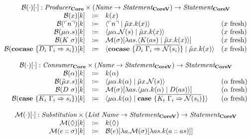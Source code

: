 \begin{gather*}
  \begin{array}{rcll}
    \multicolumn{4}{c}{\bind{\cdot}{\cdot} : \emph{Producer}_{\targetlang{}} \times (\emph{Name} \rightarrow \emph{Statement}_{\targetvar{}}) \rightarrow \emph{Statement}_{\targetvar{}}}\\
    \bind{x}{k} & \coloneq & k(x) & \\
    \bind{\lit{n}}{k} & \coloneq & \cut{\lit{n}}{\tilde{\mu}x.k(x)} & \fresh{x} \\
    \bind{\mu\alpha.s}{k} & \coloneq & \cut{\mu\alpha.\name{s}}{\tilde{\mu}x.k(x)} & \fresh{x} \\
    \bind{K\ \sigma}{k} & \coloneq & \binds{\sigma}{\lambda as.\cut{K(as)}{\tilde{\mu}x.k(x)}} & \fresh{x} \\
    \bind{\cocase{\overline{D_i\ \Gamma_i \Rightarrow s_i}}}{k} & \coloneq & \cut{\cocase{\overline{D_i\ \Gamma_i \Rightarrow \name{s_i}}}}{\tilde{\mu}x.k(x)} & \fresh{x} \\
    \\
    \multicolumn{4}{c}{\bind{\cdot}{\cdot} : \emph{Consumer}_{\targetlang{}} \times (\emph{Name} \rightarrow \emph{Statement}_{\targetvar{}}) \rightarrow \emph{Statement}_{\targetvar{}}}\\
    \bind{\alpha}{k} & \coloneq & k(\alpha) & \\
    \bind{\tilde{\mu}x.s}{k} & \coloneq & \cut{\mu\alpha.k(\alpha)}{\tilde{\mu}x.\name{s}} & \fresh{\alpha} \\
    \bind{D\ \sigma}{k} & \coloneq & \binds{\sigma}{\lambda as.\cut{\mu\alpha.k(\alpha)}{D(as)}} & \fresh{\alpha} \\
    \bind{\case{\overline{K_i\ \Gamma_i \Rightarrow s_i}}}{k} & \coloneq & \cut{\mu\alpha.k(\alpha)}{\case{\overline{K_i\ \Gamma_i \Rightarrow \name{s_i}}}} & \fresh{\alpha} \\
    \\
    \multicolumn{4}{c}{\binds{\cdot}{\cdot} : \emph{Substitution} \times (\emph{List Name} \rightarrow \emph{Statement}_{\targetvar{}}) \rightarrow \emph{Statement}_{\targetvar{}}}\\
    \binds{\nil}{k} & \coloneq & k(\nil) & \\
    \binds{e :: \sigma}{k} & \coloneq & \bind{e}{\lambda a.\binds{\sigma}{\lambda as.k(a :: as)}} & \\
  \end{array}
\end{gather*}
